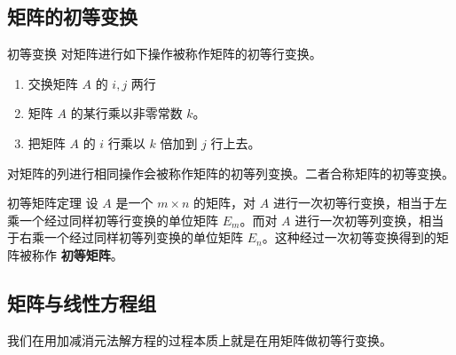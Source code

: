 \documentclass[a4paper,12pt]{ctexart}
\begin{document}
\subsection{矩阵的初等变换}

\begin{mydef}{初等变换}{}
对矩阵进行如下操作被称作矩阵的初等行变换。
    \begin{enumerate}
        \item 交换矩阵 $A$ 的 $i,j$ 两行
        \item 矩阵 $A$ 的某行乘以非零常数 $k$。
        \item 把矩阵 $A$ 的 $i$ 行乘以 $k$ 倍加到 $j$ 行上去。
    \end{enumerate}
    对矩阵的列进行相同操作会被称作矩阵的初等列变换。二者合称矩阵的初等变换。
    \end{mydef}
    
    \begin{mythm}{初等矩阵定理}{}
    设 $A$ 是一个 $m \times n$ 的矩阵，对 $A$ 进行一次初等行变换，相当于左乘一个经过同样初等行变换的单位矩阵 $E_m$。而对 $A$ 进行一次初等列变换，相当于右乘一个经过同样初等列变换的单位矩阵 $E_n$。这种经过一次初等变换得到的矩阵被称作 \textbf{初等矩阵}。
\end{mythm}

\subsection{矩阵与线性方程组}

我们在用加减消元法解方程的过程本质上就是在用矩阵做初等行变换。
    
\end{document}
